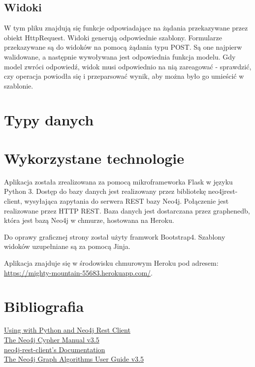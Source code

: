 \documentclass[12pt]{article}
\begin{document}
\subsection{Widoki}
W tym pliku znajdują się funkcje odpowiadające na żądania przekazywane przez obiekt HttpRequest. Widoki generują odpowiednie szablony. Formularze przekazywane są do widoków na pomocą żądania typu POST. Są one najpierw walidowane, a następnie wywoływana jest odpowiednia funkcja modelu. Gdy model zwróci odpowiedź, widok musi odpowiednio na nią zareagować - sprawdzić, czy operacja powiodła się i przeparsować wynik, aby można było go umieścić w szablonie.

\section{Typy danych}

\section{Wykorzystane technologie}
Aplikacja została zrealizowana za pomocą mikroframeworka Flask w języku Python 3. Dostęp do bazy danych jest realizowany przez bibliotekę neo4jrest- client, wysyłająca zapytania do serwera REST bazy Neo4j. Połączenie jest realizowane przez HTTP REST. Baza danych jest dostarczana przez graphenedb, która jest bazą Neo4j w chmurze, hostowana na Heroku.

Do oprawy graficznej strony został użyty framwork Bootstrap4. Szablony widoków uzupełniane są za pomocą Jinja.

Aplikacja znajduje się w środowisku chmurowym Heroku pod adresem:
\url{https://mighty-mountain-55683.herokuapp.com/}.


\section{Bibliografia}
\href{https://devcenter.heroku.com/articles/graphenedb#using-with-python-and-neo4j-rest-client}{Using with Python and Neo4j Rest Client}
\\
\href{https://neo4j.com/docs/cypher-manual/current/}{The Neo4j Cypher Manual v3.5}
\\
\href{https://neo4j-rest-client.readthedocs.io/en/latest/info.html}{neo4j-rest-client’s Documentation}
\\
\href{https://neo4j.com/docs/graph-algorithms/current/}{The Neo4j Graph Algorithms User Guide v3.5}
\end{document}
